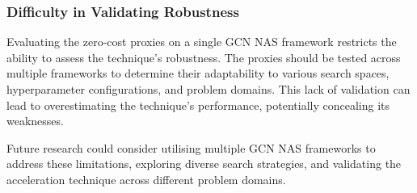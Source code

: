 \begin{comment}
Fra MAX:
Jeg tenker at dette ikke har så voldsomt mye med zero-cost proxies som er hovedpoenget med denne thesisen. Har derfor valgt å fjerne den foreløpig. 

\subsubsection{Restricted Exploration of \gls{NAS} Techniques}
Focusing on a single framework limits exploring various \gls{NAS} techniques for \gls{GCN}. Employing multiple \gls{GCN} \gls{NAS} frameworks would enable the investigation of different search strategies, optimisation methods, and search space configurations, which could lead to a deeper understanding of the factors that influence the efficiency and effectiveness of the \gls{NAS} acceleration technique.
\end{comment}


    
\subsubsection{Difficulty in Validating Robustness}

Evaluating the zero-cost proxies on a single \gls{GCN} \gls{NAS} framework restricts the ability to assess the technique's robustness. The proxies should be tested across multiple frameworks to determine their adaptability to various search spaces, hyperparameter configurations, and problem domains. This lack of validation can lead to overestimating the technique's performance, potentially concealing its weaknesses.

Future research could consider utilising multiple \gls{GCN} \gls{NAS} frameworks to address these limitations, exploring diverse search strategies, and validating the acceleration technique across different problem domains. 
